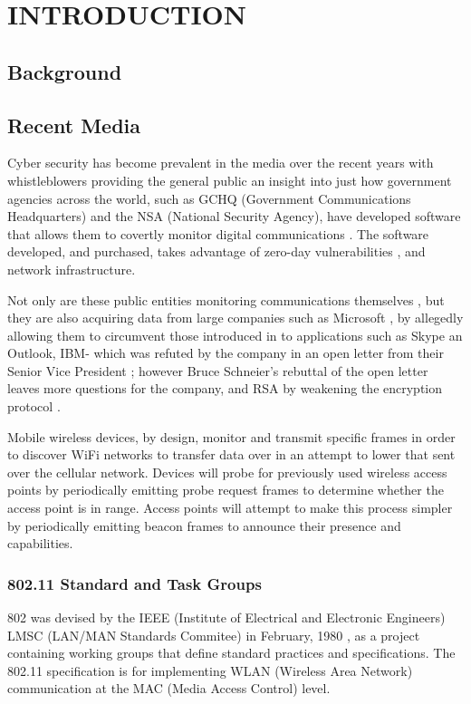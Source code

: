 \section {INTRODUCTION}
\subsection{Background}
\subsection{Recent Media}
Cyber security has become prevalent in the media over the recent years with whistleblowers \cite{intro:guardian_snowden} providing the general public an insight into just how government agencies across the world, such as GCHQ \cite{intro:gchq_home} (Government Communications Headquarters) and the NSA \cite{intro:nsa_home} (National Security Agency), have developed software \cite{intro:schneier_nsa_1}\cite{intro:schneier_nsa_3} that allows them to covertly monitor digital communications \cite{intro:schneier_nsa_4}. The software developed, and purchased, takes advantage of zero-day vulnerabilities \cite{intro:nsa_invoice}, and network infrastructure.

Not only are these public entities monitoring communications themselves \cite{intro:schneier_nsa_2}, but they are also acquiring data from large companies such as Microsoft \cite{intro:guardian_ms_nsa}, by allegedly allowing them to circumvent those introduced in to applications such as Skype an Outlook, IBM- which was refuted by the company in an open letter from their Senior Vice President \cite{intro:ibm_open_letter}; however Bruce Schneier’s rebuttal \cite{intro:open_open_letter} of the open letter leaves more questions for the company, and RSA by  weakening the encryption protocol \cite{intro:bristol_open_letter}.

Mobile wireless devices, by design, monitor and transmit specific frames in order to discover WiFi networks to transfer data over in an attempt to lower that sent over the cellular network. Devices will probe for previously used wireless access points by periodically emitting probe request frames to determine whether the access point is in range. Access points will attempt to make this process simpler by periodically emitting beacon frames to announce their presence and capabilities.

\clearpage
\subsubsection{802.11 Standard and Task Groups}
802 was devised by the IEEE (Institute of Electrical and Electronic Engineers) LMSC (LAN/MAN Standards Commitee) in February, 1980 \cite{intro:ieee_decrypted}, as a project containing working groups that define standard practices and specifications. The 802.11 specification is for implementing WLAN (Wireless Area Network) communication at the MAC (Media Access Control) level. 

